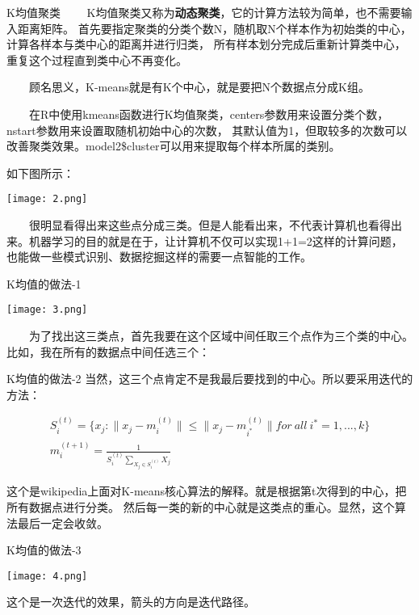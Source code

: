 \documentclass[cjk]{beamer}
\begin{document}
\begin{CJK*}{GBK}{kai}
\begin{frame}{K均值聚类}
\ \ \ \ K均值聚类又称为\textbf{动态聚类}，它的计算方法较为简单，也不需要输入距离矩阵。
首先要指定聚类的分类个数N，随机取N个样本作为初始类的中心，计算各样本与类中心的距离并进行归类，
所有样本划分完成后重新计算类中心，重复这个过程直到类中心不再变化。

\ \ \ \ 顾名思义，K-means就是有K个中心，就是要把N个数据点分成K组。

\ \ \ \ 在R中使用kmeans函数进行K均值聚类，centers参数用来设置分类个数，nstart参数用来设置取随机初始中心的次数，
其默认值为1，但取较多的次数可以改善聚类效果。model2\$cluster可以用来提取每个样本所属的类别。
\end{frame}



\begin{frame}{如下图所示：}
\begin{center}
 \texttt{[image: 2.png]}
\end{center}
 \ \ \ \   很明显看得出来这些点分成三类。但是人能看出来，不代表计算机也看得出来。机器学习的目的就是在于，让计算机不仅可以实现1+1=2这样的计算问题，
 也能做一些模式识别、数据挖掘这样的需要一点智能的工作。
\end{frame}

\begin{frame}{K均值的做法-1}
\begin{center}
\texttt{[image: 3.png]}
\end{center}
\ \ \ \ 为了找出这三类点，首先我要在这个区域中间任取三个点作为三个类的中心。比如，我在所有的数据点中间任选三个：
\end{frame}

\begin{frame}{K均值的做法-2}
  当然，这三个点肯定不是我最后要找到的中心。所以要采用迭代的方法：

  \begin{eqnarray}
    S_i^{(t)}=\{x_j: \|x_j -m_i^{(t)}\| \leq \|x_j -m_{i^*}^{(t)}\| for \  all \  i^*=1,...,k \}  \\
    m_i^{(t+1)}=\frac{1}{S_i^{(t)} \sum_{X_j \in S_i^{(t)}} X_j}
  \end{eqnarray}

  这个是wikipedia上面对K-means核心算法的解释。就是根据第t次得到的中心，把所有数据点进行分类。
  然后每一类的新的中心就是这类点的重心。显然，这个算法最后一定会收敛。
\end{frame}


\begin{frame}{K均值的做法-3}
\begin{center}
  \texttt{[image: 4.png]}
  \end{center}
  这个是一次迭代的效果，箭头的方向是迭代路径。
\end{frame}


\end{CJK*}
\end{document}
